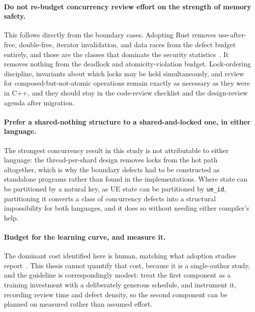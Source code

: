 \documentclass[english,twoside,openright,a4paper,censored,csm,software-track-2020]{HYthesisML}
\begin{document}
\paragraph{Do not re-budget concurrency review effort on the strength of memory safety.}
This follows directly from the boundary cases. Adopting Rust removes use-after-free,
double-free, iterator invalidation, and data races from the defect budget entirely, and those
are the classes that dominate the security statistics~\cite{msrc2019memory,google2022android}.
It removes nothing from the deadlock and atomicity-violation budget. Lock-ordering discipline,
invariants about which locks may be held simultaneously, and review for
composed-but-not-atomic operations remain exactly as necessary as they were in C++, and they
should stay in the code-review checklist and the design-review agenda after migration.

\paragraph{Prefer a shared-nothing structure to a shared-and-locked one, in either language.}
The strongest concurrency result in this study is not attributable to either language: the
thread-per-shard design removes locks from the hot path altogether, which is why the boundary
defects had to be constructed as standalone programs rather than found in the implementations.
Where state can be partitioned by a natural key, as UE state can be partitioned by
\texttt{ue\_id}, partitioning it converts a class of concurrency defects into a structural
impossibility for both languages, and it does so without needing either compiler's help.

\paragraph{Budget for the learning curve, and measure it.}
The dominant cost identified here is human, matching what adoption studies
report~\cite{fulton2021adopting}. This thesis cannot quantify that cost, because it is a
single-author study, and the guideline is correspondingly modest: treat the first component as
a training investment with a deliberately generous schedule, and instrument it, recording
review time and defect density, so the second component can be planned on measured rather than
assumed effort.
\end{document}
